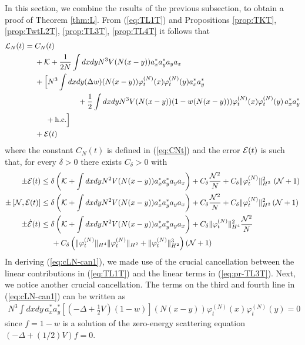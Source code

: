\documentclass[11pt,a4paper,DIV11]{scrartcl}	%
\newcommand{\cE}{{\cal E}}
\newcommand{\cK}{{\cal K}}
\newcommand{\cL}{{\cal L}}
\newcommand{\cN}{{\cal N}}
\begin{document}
In this section, we combine the results of the previous subsection, to obtain a proof of Theorem \ref{thm:L}. {F}rom (\ref{eq:TL1T}) and Propositions \ref{prop:TKT}, \ref{prop:TwtL2T}, \ref{prop:TL3T}, \ref{prop:TL4T} it follows that
\begin{equation}\label{eq:cLN-can1} \begin{split} 
\cL_N (t) = \; &C_N (t) \\
&+ \cK  + \frac{1}{2N}  \int dx dy N^3 V (N (x-y)) a_x^* a_y^* a_y a_x \\
&+ \Big[ N^3 \int dx dy (\Delta w) (N (x-y)) \varphi_t^{(N)} (x) \varphi_t^{(N)} (y)  a_x^* a_y^* \\ 
&\hspace{2cm}+ \frac{1}{2} \int dx dy N^3 V(N (x-y)) (1- w(N(x-y))) \varphi_t^{(N)} (x) \varphi_t^{(N)} (y)\, a_x^* a_y^* \\&\hspace{.5cm}+ \text{h.c.} \Big]  
\\ &+ \cE (t) 
\end{split} \end{equation}
where the constant $C_N (t)$ is defined in (\ref{eq:CNt}) and the error $\cE (t)$ is such that, for every $\delta > 0$ there exists $C_\delta > 0$ with
\begin{equation}\label{eq:cE-tot}
\begin{split} \pm \cE (t) &\leq \delta \left( \cK + \int dx dy N^2 V(N (x-y)) a_x^* a_y^* a_y a_x \right) + C_\delta \frac{\cN^2}{N} + C_\delta \| \varphi_t^{(N)} \|_{H^2}^2 \, \left( \cN + 1 \right) \\
\pm \left[ \cN ,  \cE (t)\right]  &\leq \delta \left( \cK + \int dx dy N^2 V(N (x-y)) a_x^* a_y^* a_y a_x \right) + C_\delta \frac{\cN^2}{N}  + C_\delta \| \varphi^{(N)}_t \|_{H^2}^2 \left( \cN + 1 \right)\\
\pm \dot{\cE} (t) & \leq \delta \left( \cK + \int dx dy N^2 V(N (x-y)) a_x^* a_y^* a_y a_x \right) + C_\delta \| \varphi_t^{(N)} \|_{H^4}^2 \frac{\cN^2}{N} \\ &\hspace{.5cm} + C_\delta \left( \| \varphi_t^{(N)} \|_{H^4}  \| \varphi_t^{(N)} \|_{H^2} + \| \varphi_t^{(N)} \|_{H^2}^3 \right) \left(\cN+1 \right) 
\end{split} \end{equation}
In deriving (\ref{eq:cLN-can1}), we made use of the crucial cancellation between the linear contributions in (\ref{eq:TL1T}) and the linear terms in (\ref{eq:pr-TL3T}).  Next, we notice another crucial cancellation. The terms on the third and fourth line in (\ref{eq:cLN-can1}) can be written as
\[ \begin{split} 
N^3 \int dx dy \, a_x^* a_y^* \left[ \left(-\Delta +\frac{1}{2} V \right)(1-w) \right](N(x-y)) \varphi_t^{(N)} (x) \varphi_t^{(N)} (y) = 0 
\end{split}\]
since $f = 1-w$ is a solution of the zero-energy scattering equation $(-\Delta + (1/2) V)f = 0$.
\end{document}

